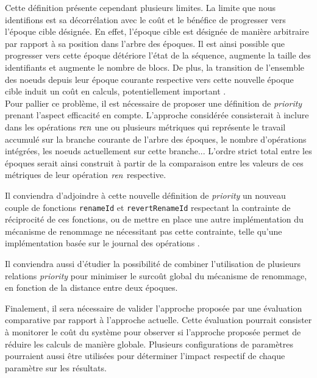 Cette définition présente cependant plusieurs limites.
La limite que nous identifions est sa décorrélation avec le coût et le bénéfice de progresser vers l'époque cible désignée.
En effet, l'époque cible est désignée de manière arbitraire par rapport à sa position dans l'arbre des époques.
Il est ainsi possible que progresser vers cette époque détériore l'état de la séquence, \ie augmente la taille des identifiants et augmente le nombre de blocs.
De plus, la transition de l'ensemble des noeuds depuis leur époque courante respective vers cette nouvelle époque cible induit un coût en calculs, potentiellement important .\\

Pour pallier ce problème, il est nécessaire de proposer une définition de \emph{priority} prenant l'aspect efficacité en compte.
L'approche considérée consisterait à inclure dans les opérations $\mathit{ren}$ une ou plusieurs métriques qui représente le travail accumulé sur la branche courante de l'arbre des époques, \eg le nombre d'opérations intégrées, les noeuds actuellement sur cette branche...
L'ordre strict total entre les époques serait ainsi construit à partir de la comparaison entre les valeurs de ces métriques de leur opération $\mathit{ren}$ respective.

Il conviendra d'adjoindre à cette nouvelle définition de \emph{priority} un nouveau couple de fonctions \texttt{renameId} et \texttt{revertRenameId} respectant la contrainte de réciprocité de ces fonctions, ou de mettre en place une autre implémentation du mécanisme de renommage ne nécessitant pas cette contrainte, telle qu'une implémentation basée sur le journal des opérations .

Il conviendra aussi d'étudier la possibilité de combiner l'utilisation de plusieurs relations \emph{priority} pour minimiser le surcoût global du mécanisme de renommage, \eg en fonction de la distance entre deux époques.

Finalement, il sera nécessaire de valider l'approche proposée par une évaluation comparative par rapport à l'approche actuelle.
Cette évaluation pourrait consister à monitorer le coût du système pour observer si l'approche proposée permet de réduire les calculs de manière globale.
Plusieurs configurations de paramètres pourraient aussi être utilisées pour déterminer l'impact respectif de chaque paramètre sur les résultats.
